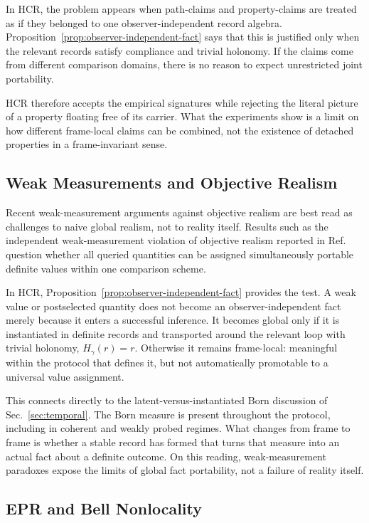 \documentclass[aps,prd,twocolumn,superscriptaddress,nofootinbib,floatfix]{revtex4-2}
\newcommand{\HCR}{HCR}
\newcommand{\CR}{\HCR}  %
\begin{document}
In \CR{}, the problem appears when path-claims and property-claims are treated as if they belonged to one observer-independent record algebra. Proposition~\ref{prop:observer-independent-fact} says that this is justified only when the relevant records satisfy compliance and trivial holonomy. If the claims come from different comparison domains, there is no reason to expect unrestricted joint portability.

\CR{} therefore accepts the empirical signatures while rejecting the literal picture of a property floating free of its carrier. What the experiments show is a limit on how different frame-local claims can be combined, not the existence of detached properties in a frame-invariant sense.

\subsection{Weak Measurements and Objective Realism}

Recent weak-measurement arguments against objective realism are best read as challenges to naive global realism, not to reality itself. Results such as the independent weak-measurement violation of objective realism reported in Ref.~\cite{rybotyckiIdenticalIndependentQuantum2026} question whether all queried quantities can be assigned simultaneously portable definite values within one comparison scheme.

In \CR{}, Proposition~\ref{prop:observer-independent-fact} provides the test. A weak value or postselected quantity does not become an observer-independent fact merely because it enters a successful inference. It becomes global only if it is instantiated in definite records and transported around the relevant loop with trivial holonomy, $H_\gamma(r) = r$. Otherwise it remains frame-local: meaningful within the protocol that defines it, but not automatically promotable to a universal value assignment.

This connects directly to the latent-versus-instantiated Born discussion of Sec.~\ref{sec:temporal}. The Born measure is present throughout the protocol, including in coherent and weakly probed regimes. What changes from frame to frame is whether a stable record has formed that turns that measure into an actual fact about a definite outcome. On this reading, weak-measurement paradoxes expose the limits of global fact portability, not a failure of reality itself.

\subsection{EPR and Bell Nonlocality}
\end{document}
